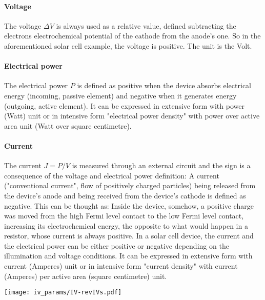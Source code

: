 \paragraph{Voltage} The voltage $\Delta V$ is always used as a relative value, defined subtracting the electrons electrochemical potential of the cathode from the anode's one. So in the aforementioned solar cell example, the voltage is positive. The unit is the Volt.

\paragraph{Electrical power} The electrical power $P$ is defined as positive when the device absorbs electrical energy (incoming, passive element) and negative when it generates energy (outgoing, active element). It can be expressed in extensive form with power (Watt) unit or in intensive form "electrical power density" with power over active area unit (Watt over square centimetre).

\paragraph{Current} The current $J=P/V$ is measured through an external circuit and the sign is a consequence of the voltage and electrical power definition: A current ("conventional current", flow of positively charged particles) being released from the device's anode and being received from the device's cathode is defined as negative. This can be thought as: Inside the device, somehow, a positive charge was moved from the high Fermi level contact to the low Fermi level contact, increasing its electrochemical energy, the opposite to what would happen in a resistor, whose current is always positive. In a solar cell device, the current and the electrical power can be either positive or negative depending on the illumination and voltage conditions. It can be expressed in extensive form with current (Amperes) unit or in intensive form "current density" with current (Amperes) per active area (square centimetre) unit.

\begin{SCfigure}
	\centering
	\texttt{[image: iv\_params/IV-revIVs.pdf]}
	\label{fig:iv_params}
\end{SCfigure}

